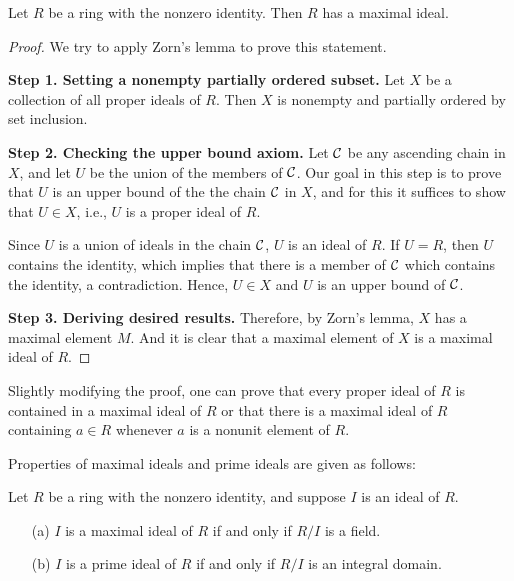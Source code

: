 \begin{prop}
    Let $R$ be a ring with the nonzero identity.
    Then $R$ has a maximal ideal.
\end{prop}
\begin{proof}
    We try to apply Zorn's lemma to prove this statement.
    
    \textbf{Step 1. Setting a nonempty partially ordered subset.}\newline
    Let $X$ be a collection of all proper ideals of $R$.
    Then $X$ is nonempty and partially ordered by set inclusion.

    \textbf{Step 2. Checking the upper bound axiom.}\newline
    Let ${\mathcal{C}}$ be any ascending chain in $X$, and let $U$ be the union of the members of ${\mathcal{C}}$.
    Our goal in this step is to prove that $U$ is an upper bound of the the chain ${\mathcal{C}}$ in $X$, and for this it suffices to show that $U\in X$, i.e., $U$ is a proper ideal of $R$.

    Since $U$ is a union of ideals in the chain ${\mathcal{C}}$, $U$ is an ideal of $R$.
    If $U=R$, then $U$ contains the identity, which implies that there is a member of ${\mathcal{C}}$ which contains the identity, a contradiction.
    Hence, $U\in X$ and $U$ is an upper bound of ${\mathcal{C}}$.

    \textbf{Step 3. Deriving desired results.}\newline
    Therefore, by Zorn's lemma, $X$ has a maximal element $M$.
    And it is clear that a maximal element of $X$ is a maximal ideal of $R$.
\end{proof}
\begin{rmk}
    Slightly modifying the proof, one can prove that every proper ideal of $R$ is contained in a maximal ideal of $R$ or that there is a maximal ideal of $R$ containing $a\in R$ whenever $a$ is a nonunit element of $R$.
\end{rmk}

Properties of maximal ideals and prime ideals are given as follows:
\begin{prop}
    Let $R$ be a ring with the nonzero identity, and suppose $I$ is an ideal of $R$.
    \begin{enumerate}
        \item[(a)]
        {
            $I$ is a maximal ideal of $R$ if and only if $R/I$ is a field.
        }
        \item[(b)]
        {
            $I$ is a prime ideal of $R$ if and only if $R/I$ is an integral domain.
        }
    \end{enumerate}
\end{prop}